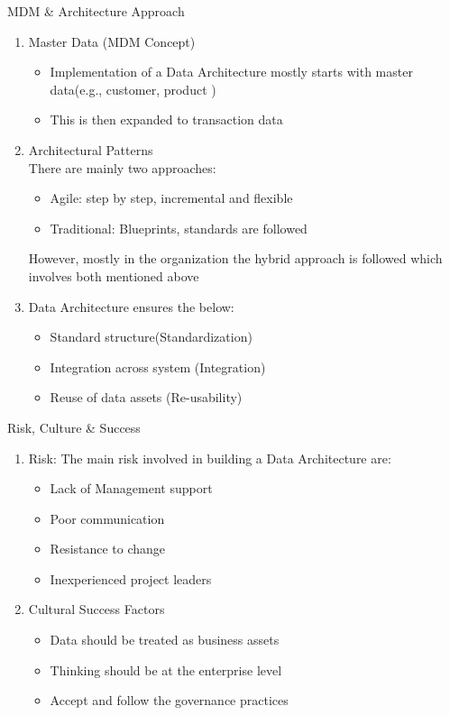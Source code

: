 \documentclass[aspectratio=169,professionalfonts]{beamer}
\begin{document}
\begin{frame}{MDM \& Architecture Approach}
\begin{enumerate}
	\item Master Data (MDM Concept)
	\begin{itemize}
		\item Implementation of a Data Architecture mostly starts with master data(e.g., customer, product	)
		\item This is then expanded to transaction data
	\end{itemize}
	\item Architectural Patterns\\
	There are mainly two approaches:
	\begin{itemize}
		\item Agile: step by step, incremental and flexible
		\item Traditional: Blueprints, standards are followed
	\end{itemize}
	However, mostly in the organization the hybrid approach is followed which involves both mentioned above
	\item Data Architecture ensures the below:
	\begin{itemize}
		\item Standard structure(Standardization)
		\item Integration across system (Integration)
		\item Reuse of data assets (Re-usability)
	\end{itemize}
\end{enumerate}
\end{frame}


\begin{frame}{Risk, Culture \& Success}
\begin{enumerate}
	\item Risk: The main risk involved in building a Data Architecture are:
	\begin{itemize}
		\item Lack of Management support
		\item Poor communication
		\item Resistance to change
		\item Inexperienced project leaders
	\end{itemize}
	\item Cultural Success Factors\\
	\begin{itemize}
		\item Data should be treated as business assets
		\item Thinking should be at the enterprise level
		\item Accept and follow the governance practices
	\end{itemize}
\end{enumerate}
\end{frame}
\end{document}
